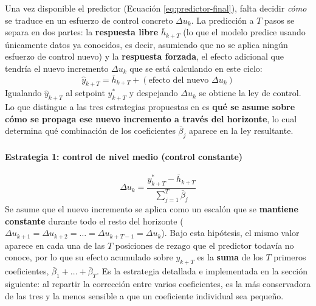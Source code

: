 Una vez disponible el predictor (Ecuación \ref{eq:predictor-final}), falta decidir \textit{cómo} se traduce en un esfuerzo de control concreto $\Delta u_k$. La predicción a $T$ pasos se separa en dos partes: la \textbf{respuesta libre} $\bar h_{k+T}$ (lo que el modelo predice usando únicamente datos ya conocidos, es decir, asumiendo que no se aplica ningún esfuerzo de control nuevo) y la \textbf{respuesta forzada}, el efecto adicional que tendría el nuevo incremento $\Delta u_k$ que se está calculando en este ciclo:
\[
  \hat y_{k+T} = \bar h_{k+T} + (\text{efecto del nuevo } \Delta u_k)
\]
Igualando $\hat y_{k+T}$ al setpoint $y^*_{k+T}$ y despejando $\Delta u_k$ se obtiene la ley de control. Lo que distingue a las tres estrategias propuestas en \cite{ydstie1985extended} es \textbf{qué se asume sobre cómo se propaga ese nuevo incremento a través del horizonte}, lo cual determina qué combinación de los coeficientes $\bar\beta_j$ aparece en la ley resultante.

\paragraph{Estrategia 1: control de nivel medio (control constante)}
\begin{equation}
  \Delta u_k = \frac{y^*_{k+T} - \bar h_{k+T}}{\displaystyle\sum_{j=1}^{T} \bar\beta_j}
  \label{eq:estrategia1}
\end{equation}
Se asume que el nuevo incremento se aplica como un escalón que se \textbf{mantiene constante} durante todo el resto del horizonte ($\Delta u_{k+1} = \Delta u_{k+2} = \ldots = \Delta u_{k+T-1} = \Delta u_k$). Bajo esta hipótesis, el mismo valor aparece en cada una de las $T$ posiciones de rezago que el predictor todavía no conoce, por lo que su efecto acumulado sobre $y_{k+T}$ es la \textbf{suma} de los $T$ primeros coeficientes, $\bar\beta_1 + \ldots + \bar\beta_T$. Es la estrategia detallada e implementada en la sección siguiente: al repartir la corrección entre varios coeficientes, es la más conservadora de las tres y la menos sensible a que un coeficiente individual sea pequeño.

